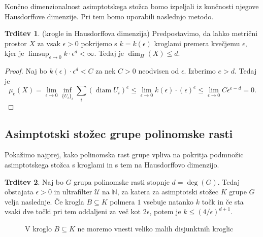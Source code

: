 \documentclass[11pt]{book}
\def\NN{\mathbb{N}}
\def\UU{\mathcal{U}}
\DeclareMathOperator\diam{diam}
\theoremstyle{definition}
\theoremstyle{zgled}
\theoremstyle{odprtproblem}
\theoremstyle{domacanaloga}
\newenvironment{dokaz}
    {\color{siva}\begin{proof}}
    {\end{proof}}
\theoremstyle{izrek}
\newtheorem*{trditev}{Trditev}
\begin{document}
Končno dimenzionalnost asimptotskega stožca bomo izpeljali iz končnosti njegove Hausdorffove dimenzije. Pri tem bomo uporabili naslednjo metodo.

\begin{trditev}{\sc (krogle in Hausdorffova dimenzija)}
Predpostavimo, da lahko metrični prostor $X$ za vsak $\epsilon > 0$ pokrijemo s $k = k(\epsilon)$ kroglami premera kvečjemu $\epsilon$, kjer je $\limsup_{\epsilon \to 0} k \cdot \epsilon^d < \infty$. Tedaj je $\dim_H(X) \leq d$.
\end{trditev}

\begin{dokaz}
Naj bo $k(\epsilon) \cdot \epsilon^d < C$ za nek $C > 0$ neodvisen od $\epsilon$. Izberimo $e > d$. Tedaj je
\[
\mu_e(X) = \lim_{\epsilon \to 0} \inf_{\{ U_i \}_i } \sum_i (\diam U_i)^e
\leq \lim_{\epsilon \to 0} k(\epsilon) \cdot (\epsilon)^e \leq \lim_{\epsilon \to 0} C \epsilon^{e-d} = 0.
\]
\end{dokaz}

\subsection{Asimptotski stožec grupe polinomske rasti}

Pokažimo najprej, kako polinomska rast grupe vpliva na pokritja podmnožic asimptotskega stožca s kroglami in s tem na Hausdorffovo dimenzijo.

\begin{trditev}
Naj bo $G$ grupa polinomske rasti stopnje $d = \deg(G)$. Tedaj obstajata $\epsilon > 0$ in ultrafilter $\UU$ na $\NN$, za katera za asimptotski stožec $K$ grupe $G$ velja naslednje. Če krogla $B \subseteq K$ polmera $1$ vsebuje natanko $k$ točk in če sta vsaki dve točki pri tem oddaljeni za več kot $2 \epsilon$, potem je $k \leq \left( 4/\epsilon \right)^{d+1}$.
\end{trditev}

\begin{figure}[t]
\centering
{}
\caption{V kroglo $B \subseteq K$ ne moremo vnesti veliko malih disjunktnih kroglic}
\end{figure}
\end{document}
